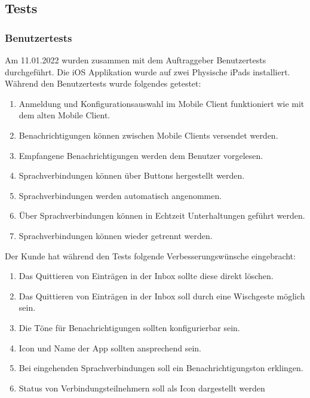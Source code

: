 \subsection{Tests}

\subsubsection{Benutzertests}

Am 11.01.2022 wurden zusammen mit dem Auftraggeber Benutzertests durchgeführt.
Die iOS Applikation wurde auf zwei Physische iPads installiert.
Während den Benutzertests wurde folgendes getestet:

\begin{enumerate}
    \item Anmeldung und Konfigurationsauswahl im Mobile Client funktioniert wie mit dem alten Mobile Client.
    \item Benachrichtigungen können zwischen Mobile Clients versendet werden.
    \item Empfangene Benachrichtigungen werden dem Benutzer vorgelesen.
    \item Sprachverbindungen können über Buttons hergestellt werden.
    \item Sprachverbindungen werden automatisch angenommen.
    \item Über Sprachverbindungen können in Echtzeit Unterhaltungen geführt werden.
    \item Sprachverbindungen können wieder getrennt werden.
\end{enumerate}

Der Kunde hat während den Tests folgende Verbesserungswünsche eingebracht:

\begin{enumerate}
    \item Das Quittieren von Einträgen in der Inbox sollte diese direkt löschen.
    \item Das Quittieren von Einträgen in der Inbox soll durch eine Wischgeste möglich sein.
    \item Die Töne für Benachrichtigungen sollten konfigurierbar sein.
    \item Icon und Name der App sollten ansprechend sein.
    \item Bei eingehenden Sprachverbindungen soll ein Benachrichtigungston erklingen.
    \item Status von Verbindungsteilnehmern soll als Icon dargestellt werden
\end{enumerate}

